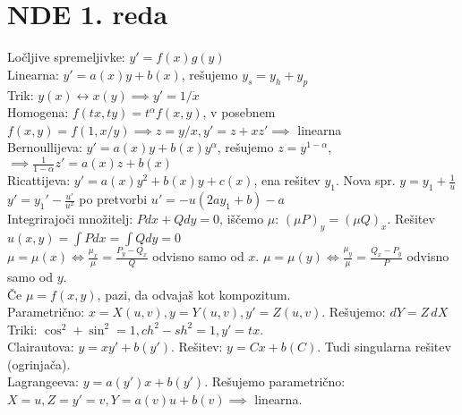 \documentclass[8pt,a4paper]{amsart}
\theoremstyle{definition} %
\theoremstyle{plain} %
\let\oldint\int
\renewcommand{\int}{\oldint \!}
\begin{document}


\section*{\textbf{NDE 1. reda}}
Ločljive spremeljivke: $y' = f(x)g(y)$ \\
Linearna: $y' = a(x)y + b(x)$, rešujemo $y_s = y_h + y_p$ \\
Trik: $y(x) \leftrightarrow x(y) \implies y' = 1/\dot{x}$ \\
Homogena: $f(tx, ty) = t^\alpha f(x, y)$, v posebnem $f(x, y) = f(1, x/y)
  \implies z = y/x, y' = z + xz' \implies$ linearna \\
Bernoullijeva: $y' = a(x)y + b(x)y^\alpha$, rešujemo $z = y^{1-\alpha}$,
  $\implies \frac{1}{1-\alpha}z' = a(x)z + b(x)$ \\
Ricattijeva: $y' = a(x)y^2 + b(x)y + c(x)$, ena rešitev $y_1$. Nova spr. $y = y_1 + \frac{1}{u}$\\
$y'=y_1'-\frac{u'}{u^2}$ po pretvorbi $u'=-u(2ay_1+b)-a$
\\
Integrirajoči množitelj: $Pdx + Qdy = 0$, iščemo $\mu$: $(\mu P)_y = (\mu Q)_x$.
Rešitev $u(x, y) = \int Pdx = \int Qdy = 0$ \\
\hspace*{20pt} $\mu = \mu(x) \iff \frac{\mu_x}{\mu} = \frac{P_y - Q_x}{Q}$ odvisno samo od $x$.
               $\mu = \mu(y) \iff \frac{\mu_y}{\mu} = \frac{Q_x - P_y}{P}$ odvisno samo od $y$. \\
\hspace*{20pt} Če $\mu = f(x, y)$, pazi, da odvajaš kot kompozitum.\\
Parametrično: $x = X(u, v), y = Y(u, v), y' = Z(u, v)$. Rešujemo: $dY = Z \, dX$ \\
\hspace*{20pt} Triki: $\cos^2 + \sin^2 = 1, ch^2 - sh^2 = 1, y' = tx.$\\
Clairautova: $y = xy' + b(y')$. Rešitev: $y = C x + b(C)$. Tudi singularna
rešitev (ogrinjača). \\
Lagrangeeva: $y = a(y')x + b(y')$. Rešujemo parametrično: $X = u, Z = y' = v, Y =
a(v)u + b(v) \implies$ linearna. \\
\end{document}
